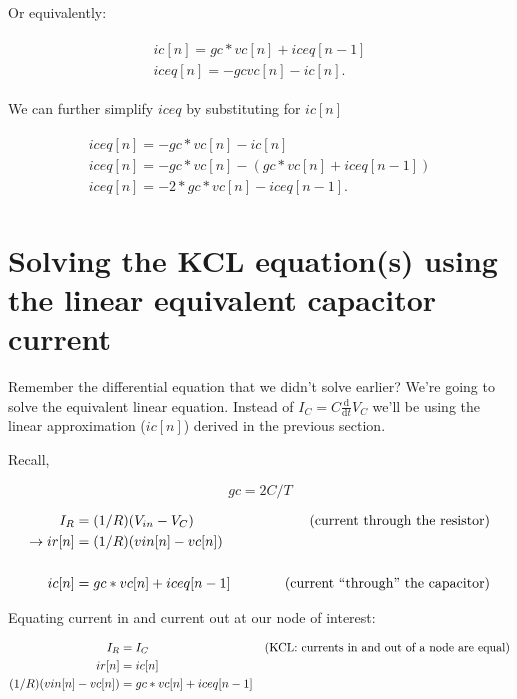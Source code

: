 \documentclass{article}
\begin{document}
Or equivalently:

\begin{eqnarray} \begin{array}{l}
ic[n] = gc * vc[n] + iceq[n-1]\\
iceq[n] = - gc vc[n] - ic[n].
\end{array} \end{eqnarray}

We can further simplify $iceq$ by substituting for $ic[n]$

\begin{eqnarray} \begin{array}{l}
iceq[n] = - gc*vc[n] - ic[n]\\
iceq[n] = - gc*vc[n] - (gc * vc[n] + iceq[n-1])\\
iceq[n] = -2*gc*vc[n] - iceq[n-1].
\end{array} \end{eqnarray}


\section{Solving the KCL equation(s) using the linear equivalent capacitor current}

Remember the differential equation that we didn't solve earlier? We're
going to solve the equivalent linear equation. Instead of 
$I_C = C\frac{\mathrm{d}}{\mathrm{d}t}V_C$
we'll be using the linear approximation ($ic[n]$) derived in the previous section.

Recall,

\begin{equation}
gc = 2C/T
\end{equation}

\begin{equation}
\begin{aligned}
		   I_R &= (1/R) (V_{in} - V_C)	 	&\text{(current through the resistor)} \\
\to	     ir[n] &= (1/R) (vin[n] - vc[n])    \hspace{.1\textwidth}& \\
\\
	     ic[n] &= gc * vc[n] + iceq[n-1]    &\text{(current ``through'' the capacitor)}
\end{aligned}
\end{equation}

Equating current in and current out at our node of interest:

\begin{equation}
\begin{aligned}
                   I_R &= I_C	 	&\text{(KCL: currents in and out of a node are equal)} \\
                 ir[n] &= ic[n]	\hspace{.1\textwidth}& \\
(1/R) (vin[n] - vc[n]) &= gc * vc[n] + iceq[n-1]
\end{aligned}
\end{equation}
\end{document}
